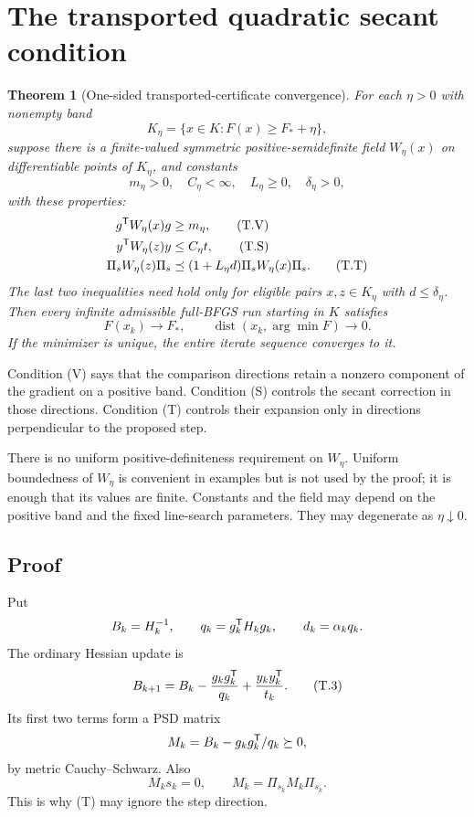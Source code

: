 \documentclass[10pt,oneside,openany]{book}
\newtheorem{theorem}{Theorem}[chapter]
\theoremstyle{remark}\newtheorem{remark}{Remark}[chapter]
\begin{document}
\section{The transported quadratic secant condition}
\begin{theorem}[One-sided transported-certificate convergence]
For each $\eta>0$ with nonempty band
\[
 K_\eta=\{x\in K:F(x)\ge F_*+\eta\},
\]
suppose there is a finite-valued symmetric positive-semidefinite field $W_\eta(x)$ on differentiable points of $K_\eta$, and constants
\[
 m_\eta>0,\quad C_\eta<\infty,\quad L_\eta\ge0,\quad \delta_\eta>0,
\]
with these properties:
\begin{align}
 g^{\mathsf T} W_\eta(x)g&\ge m_\eta, \tag{T.V}\\
 y^{\mathsf T} W_\eta(z)y&\le C_\eta t, \tag{T.S}\\
 \Pi_s W_\eta(z)\Pi_s&\preceq
 (1+L_\eta d)\Pi_s W_\eta(x)\Pi_s. \tag{T.T}
\end{align}
The last two inequalities need hold only for eligible pairs $x,z\in K_\eta$ with $d\le\delta_\eta$. Then every infinite admissible full-BFGS run starting in $K$ satisfies
\[
 F(x_k)\to F_*,\qquad \operatorname{dist}(x_k,\arg\min F)\to0.
\]
If the minimizer is unique, the entire iterate sequence converges to it.
\end{theorem}
Condition (V) says that the comparison directions retain a nonzero component of the gradient on a positive band. Condition (S) controls the secant correction in those directions. Condition (T) controls their expansion only in directions perpendicular to the proposed step.

There is no uniform positive-definiteness requirement on $W_\eta$. Uniform boundedness of $W_\eta$ is convenient in examples but is not used by the proof; it is enough that its values are finite. Constants and the field may depend on the positive band and the fixed line-search parameters. They may degenerate as $\eta\downarrow0$.

\subsection{Proof}
Put
\[
 B_k=H_k^{-1},\qquad q_k=g_k^{\mathsf T} H_kg_k,\qquad
 d_k=\alpha_kq_k.
\]
The ordinary Hessian update is
\begin{equation}
 B_{k+1}=B_k-\frac{g_kg_k^{\mathsf T}}{q_k}+\frac{y_ky_k^{\mathsf T}}{t_k}. \tag{T.3}
\end{equation}
Its first two terms form a PSD matrix
\[
 M_k=B_k-g_kg_k^{\mathsf T}/q_k\succeq0,
\]
by metric Cauchy--Schwarz. Also
\begin{equation}
 M_ks_k=0,\qquad M_k=\Pi_{s_k}M_k\Pi_{s_k}. \tag{T.4}
\end{equation}
This is why (T) may ignore the step direction.
\end{document}
